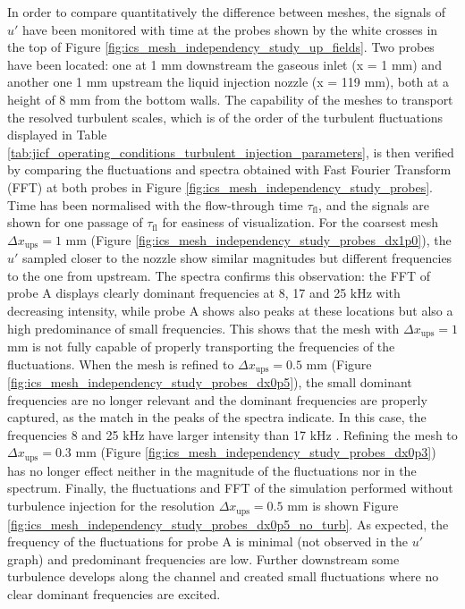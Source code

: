 In order to compare quantitatively the difference between meshes, the signals of $u'$ have been monitored with time at the probes shown by the white crosses in the top of Figure \ref{fig:ics_mesh_independency_study_up_fields}. Two probes have been located: one at 1 mm downstream the gaseous inlet (x = 1 mm) and another one 1 mm upstream the liquid injection nozzle (x = 119 mm), both at a height of 8 mm from the bottom walls. The capability of the meshes to transport the resolved turbulent scales, which is of the order of the turbulent fluctuations displayed in Table \ref{tab:jicf_operating_conditions_turbulent_injection_parameters}, is then verified by comparing the fluctuations and spectra obtained with Fast Fourier Transform (FFT) at both probes in Figure \ref{fig:ics_mesh_independency_study_probes}. Time has been normalised with the flow-through time $\tau_\mathrm{fl}$, and the signals are shown for one passage of $\tau_\mathrm{fl}$ for easiness of visualization. For the coarsest mesh $\Delta x_\mathrm{ups} = 1$ mm (Figure \ref{fig:ics_mesh_independency_study_probes_dx1p0}), the $u'$ sampled closer to the nozzle show similar magnitudes but different frequencies to the one from upstream. The spectra confirms this observation: the FFT of probe A displays clearly dominant frequencies at 8, 17 and 25 $\mathrm{kHz}$ with decreasing intensity, while probe A shows also peaks at these locations but also a high predominance of small frequencies. This shows that the mesh with $\Delta x_\mathrm{ups} = 1$ mm is not fully capable of properly transporting the frequencies of the fluctuations. When the mesh is refined to $\Delta x_\mathrm{ups} = 0.5$ mm (Figure \ref{fig:ics_mesh_independency_study_probes_dx0p5}), the small dominant frequencies are no longer relevant and the dominant frequencies are properly captured, as the match in the peaks of the spectra indicate. In this case, the frequencies 8 and 25 $\mathrm{kHz}$ have larger intensity than 17 $\mathrm{kHz}$ . Refining the mesh to $\Delta x_\mathrm{ups} = 0.3$ mm (Figure \ref{fig:ics_mesh_independency_study_probes_dx0p3}) has no longer effect neither in the magnitude of the fluctuations nor in the spectrum. Finally, the fluctuations and FFT of the simulation performed without turbulence injection for the resolution $\Delta x_\mathrm{ups} = 0.5$ mm is shown Figure \ref{fig:ics_mesh_independency_study_probes_dx0p5_no_turb}. As expected, the frequency of the fluctuations  for probe A is minimal (not observed in the $u'$ graph) and predominant frequencies are low. Further downstream some turbulence develops along the channel and created small fluctuations where no clear dominant frequencies are excited. 

